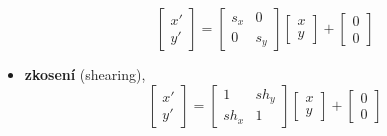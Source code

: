 \begin{itemize}
\begin{equation*}
\begin{bmatrix}
			 x'   \\[0.3em]      
			 y'
			 \end{bmatrix} = 
			 \begin{bmatrix}
			     s_x & 0     \\[0.3em]
			     0 & s_y        
			  \end{bmatrix}
			  \begin{bmatrix}
			     x     \\[0.3em]
			     y        
			     \end{bmatrix} +
			      \begin{bmatrix}
			     0     \\[0.3em]
			     0        
			     \end{bmatrix}
				\end{equation*}
	\item \textbf{zkosení} (shearing),
				\begin{equation*}
			 \begin{bmatrix}     
			 x'   \\[0.3em]      
			 y'
			 \end{bmatrix} = 
			 \begin{bmatrix}
			     1 & sh_y     \\[0.3em]
			     sh_x & 1        
			  \end{bmatrix}
			  \begin{bmatrix}
			     x     \\[0.3em]
			     y        
			     \end{bmatrix} +
			      \begin{bmatrix}
			     0     \\[0.3em]
			     0        
			     \end{bmatrix}
				\end{equation*}
\end{itemize}


